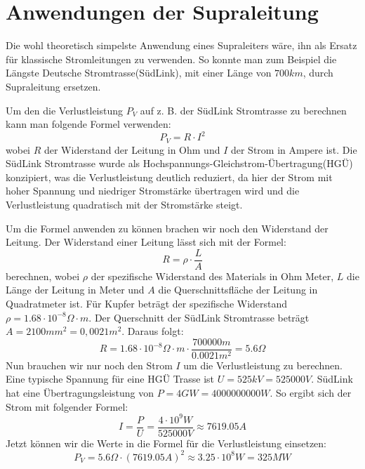 \section{Anwendungen der Supraleitung}
Die wohl theoretisch simpelste Anwendung eines Supraleiters wäre, ihn als Ersatz für klassische Stromleitungen zu 
verwenden. So konnte man zum Beispiel die Längste Deutsche Stromtrasse(SüdLink), mit einer Länge von $700km$, 
durch Supraleitung ersetzen. 

Um den die Verlustleistung $P_V$ auf z. B. der SüdLink Stromtrasse zu berechnen kann man folgende Formel verwenden:
\begin{equation}
    P_V = R \cdot I^2
\end{equation}
wobei $R$ der Widerstand der Leitung in Ohm und $I$ der Strom in Ampere ist.
Die SüdLink Stromtrasse wurde als Hochspannungs-Gleichstrom-Übertragung(HGÜ) konzipiert, was die Verlustleistung
deutlich reduziert, da hier der Strom mit hoher Spannung und niedriger Stromstärke übertragen wird und die Verlustleistung
quadratisch mit der Stromstärke steigt.

Um die Formel anwenden zu können brachen wir noch den Widerstand der Leitung. Der Widerstand einer Leitung lässt sich
mit der Formel:
\begin{equation}
    R = \rho \cdot \frac{L}{A}
\end{equation}
berechnen, wobei $\rho$ der spezifische Widerstand des Materials in Ohm Meter, $L$ die Länge der Leitung in Meter und $A$
die Querschnittsfläche der Leitung in Quadratmeter ist. Für Kupfer beträgt der spezifische Widerstand $\rho = 1.68 \cdot 10^{-8} \Omega \cdot m$.
Der Querschnitt der SüdLink Stromtrasse beträgt $A=2100mm^2 = 0,0021m^2$. Daraus folgt:
\begin{equation}
    R = 1.68 \cdot 10^{-8} \Omega \cdot m \cdot \frac{700000m}{0.0021m^2} = 5.6 \Omega
\end{equation}
Nun brauchen wir nur noch den Strom $I$ um die Verlustleistung zu berechnen. Eine typische Spannung für eine HGÜ Trasse 
ist $U = 525kV = 525000V$. SüdLink hat eine Übertragungsleistung von $P = 4GW = 4000000000W$. So ergibt sich der Strom mit folgender Formel:
\begin{equation}
    I = \frac{P}{U} = \frac{4 \cdot 10^9W}{525000V} \approx 7619.05A
\end{equation}
Jetzt können wir die Werte in die Formel für die Verlustleistung einsetzen:
\begin{equation}
    P_V = 5.6 \Omega \cdot (7619.05A)^2 \approx 3.25 \cdot 10^8W = 325MW
\end{equation}

